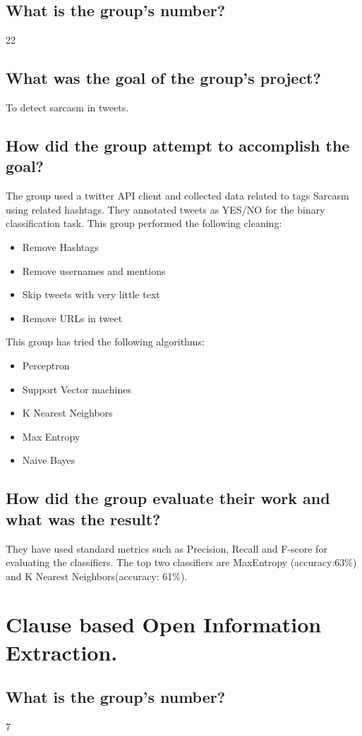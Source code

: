 \documentclass[letterpaper]{article}
\begin{document}
\subsection{What is the group's number?}
22
\subsection{What was the goal of the group's project?}
To detect sarcasm in tweets.

\subsection{How did the group attempt to accomplish the goal?}
The group used a twitter API client and collected data related to tags Sarcasm using related hashtags.
They annotated tweets as YES/NO for the binary classification task. This group performed the following cleaning:
\begin{itemize}
	\item Remove Hashtags
	\item Remove usernames and mentions
	\item Skip tweets with very little text
	\item Remove URLs in tweet
\end{itemize}
This group has tried the following algorithms:
\begin{itemize}
	\item Perceptron
	\item Support Vector machines
	\item K Nearest Neighbors
	\item Max Entropy 
	\item Naive Bayes
\end{itemize}

\subsection{How did the group evaluate their work and what was the result?}
They have used standard metrics such as Precision, Recall and F-score for evaluating the classifiers. 
The top two classifiers are MaxEntropy (accuracy:63\%) and K Nearest Neighbors(accuracy: 61\%).

\section{Clause based Open Information Extraction.}
\subsection{What is the group's number?}
7
\end{document}
